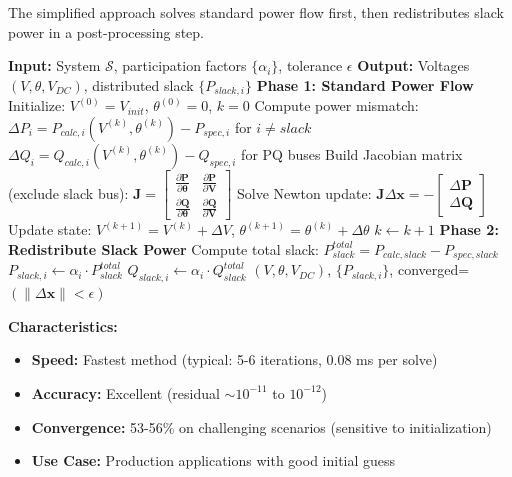 \documentclass[11pt]{article}
\begin{document}
The simplified approach solves standard power flow first, then redistributes slack power in a post-processing step.

\begin{algorithm}
\caption{Simplified NR with Distributed Slack (Post-Processing)}
\begin{algorithmic}[1]
\STATE \textbf{Input:} System $\mathcal{S}$, participation factors $\{\alpha_i\}$, tolerance $\epsilon$
\STATE \textbf{Output:} Voltages $(V, \theta, V_{DC})$, distributed slack $\{P_{slack,i}\}$
\STATE
\STATE \textbf{Phase 1: Standard Power Flow}
\STATE Initialize: $V^{(0)} = V_{init}$, $\theta^{(0)} = 0$, $k = 0$
\REPEAT
    \STATE Compute power mismatch:
    \STATE \quad $\Delta P_i = P_{calc,i}(V^{(k)}, \theta^{(k)}) - P_{spec,i}$ for $i \neq slack$
    \STATE \quad $\Delta Q_i = Q_{calc,i}(V^{(k)}, \theta^{(k)}) - Q_{spec,i}$ for PQ buses
    \STATE
    \STATE Build Jacobian matrix (exclude slack bus):
    \STATE \quad $\mathbf{J} = \begin{bmatrix} \frac{\partial \mathbf{P}}{\partial \boldsymbol{\theta}} & \frac{\partial \mathbf{P}}{\partial \mathbf{V}} \\ \frac{\partial \mathbf{Q}}{\partial \boldsymbol{\theta}} & \frac{\partial \mathbf{Q}}{\partial \mathbf{V}} \end{bmatrix}$
    \STATE
    \STATE Solve Newton update: $\mathbf{J} \Delta \mathbf{x} = -\begin{bmatrix} \Delta \mathbf{P} \\ \Delta \mathbf{Q} \end{bmatrix}$
    \STATE
    \STATE Update state: $V^{(k+1)} = V^{(k)} + \Delta V$, $\theta^{(k+1)} = \theta^{(k)} + \Delta \theta$
    \STATE $k \gets k + 1$
\STATE
\STATE \textbf{Phase 2: Redistribute Slack Power}
\STATE Compute total slack: $P_{slack}^{total} = P_{calc,slack} - P_{spec,slack}$
    \STATE $P_{slack,i} \gets \alpha_i \cdot P_{slack}^{total}$
    \STATE $Q_{slack,i} \gets \alpha_i \cdot Q_{slack}^{total}$ 
\ENDFOR
\STATE
\RETURN $(V, \theta, V_{DC})$, $\{P_{slack,i}\}$, converged=$(\|\Delta \mathbf{x}\| < \epsilon)$
\end{algorithmic}
\end{algorithm}

\textbf{Characteristics:}
\begin{itemize}
    \item \textbf{Speed:} Fastest method (typical: 5-6 iterations, 0.08 ms per solve)
    \item \textbf{Accuracy:} Excellent (residual $\sim 10^{-11}$ to $10^{-12}$)
    \item \textbf{Convergence:} 53-56\% on challenging scenarios (sensitive to initialization)
    \item \textbf{Use Case:} Production applications with good initial guess
\end{itemize}
\end{document}

